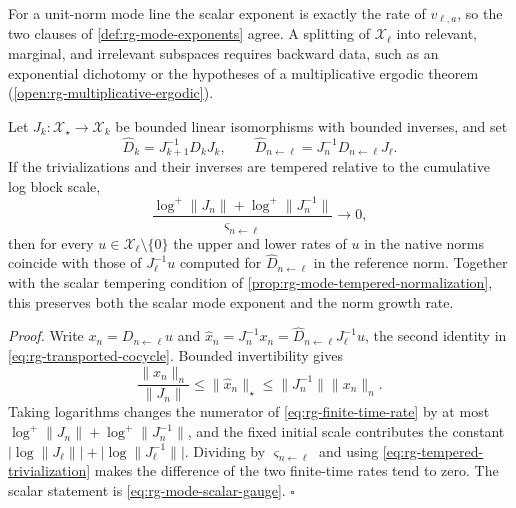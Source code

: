For a unit-norm mode line the scalar exponent is exactly the rate of
\(v_{\ell,a}\), so the two clauses of \cref{def:rg-mode-exponents} agree. A
splitting of \(\mathscr X_\ell\) into relevant, marginal, and irrelevant subspaces
requires backward data, such as an exponential dichotomy or the hypotheses of
a multiplicative ergodic theorem (\cref{open:rg-multiplicative-ergodic}).

Let \(J_k:\mathscr X_\star\to \mathscr X_k\) be bounded linear isomorphisms with bounded
inverses, and set
\begin{equation}
\widehat D_k=J_{k+1}^{-1}D_kJ_k,
\qquad
\widehat D_{n\leftarrow\ell}=J_n^{-1}D_{n\leftarrow\ell}J_\ell.
\label{eq:rg-transported-cocycle}
\end{equation}
If the trivializations and their inverses are tempered relative to the
cumulative log block scale,
\begin{equation}
\frac{\log^+\lVert J_n\rVert+\log^+\lVert J_n^{-1}\rVert}{\varsigma_{n\leftarrow\ell}}
\longrightarrow0,
\label{eq:rg-tempered-trivialization}
\end{equation}
then for every \(u\in \mathscr X_\ell\setminus\{0\}\) the upper and lower rates of
\(u\) in the native norms coincide with those of \(J_\ell^{-1}u\) computed for
\(\widehat D_{n\leftarrow\ell}\) in the reference norm. Together with the
scalar tempering condition of \cref{prop:rg-mode-tempered-normalization}, this
preserves both the scalar mode exponent and the norm growth rate.

\noindent\emph{Proof.}
Write \(x_n=D_{n\leftarrow\ell}u\) and
\(\widehat x_n=J_n^{-1}x_n=\widehat D_{n\leftarrow\ell}J_\ell^{-1}u\), the second
identity in \eqref{eq:rg-transported-cocycle}. Bounded invertibility gives
\begin{equation}
\frac{\lVert x_n\rVert_n}{\lVert J_n\rVert}
\leq\lVert\widehat x_n\rVert_\star
\leq\lVert J_n^{-1}\rVert\lVert x_n\rVert_n.
\label{eq:rg-trivialization-two-sided}
\end{equation}
Taking logarithms changes the numerator of \eqref{eq:rg-finite-time-rate} by
at most \(\log^+\lVert J_n\rVert+\log^+\lVert J_n^{-1}\rVert\), and the fixed
initial scale contributes the constant
\(\lvert\log\lVert J_\ell\rVert\rvert+\lvert\log\lVert J_\ell^{-1}\rVert\rvert\).
Dividing by \(\varsigma_{n\leftarrow\ell}\) and using
\eqref{eq:rg-tempered-trivialization} makes the difference of the two
finite-time rates tend to zero. The scalar statement is
\eqref{eq:rg-mode-scalar-gauge}. \(\square\)

